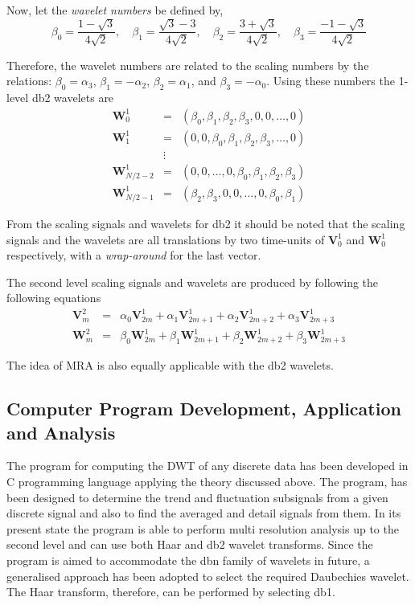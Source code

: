 \documentclass[a4paper,11pt]{article}
\begin{document}
Now, let the \emph{wavelet numbers} be defined by,
\begin{equation}
\beta_{0}=\frac{1-\sqrt{3}}{4\sqrt{2}}, \quad \beta_{1}=\frac{\sqrt{3}-3}{4\sqrt{2}}, \quad \beta_{2}=\frac{3+\sqrt{3}}{4\sqrt{2}}, \quad \beta_{3}=\frac{-1-\sqrt{3}}{4\sqrt{2}}
\end{equation}

Therefore, the wavelet numbers are related to the scaling numbers by the relations: $\beta_{0}=\alpha_{3}$, $\beta_{1}=-\alpha_{2}$, $\beta_{2}=\alpha_{1}$, and $\beta_{3}=-\alpha_{0}$. Using these numbers the 1-level db2 wavelets are
\begin{eqnarray}
\mathbf{W}_{0}^{1} & = & ( \beta_{0},\beta_{1},\beta_{2},\beta_{3},0,0,\ldots,0 ) \nonumber \\
\mathbf{W}_{1}^{1} & = & ( 0,0,\beta_{0},\beta_{1},\beta_{2},\beta_{3},\ldots,0 ) \nonumber \\
	 & \vdots & 	\nonumber \\
\mathbf{W}_{N/2-2}^{1} & = & ( 0,0,\ldots,0,\beta_{0},\beta_{1},\beta_{2},\beta_{3} ) \nonumber \\ 
\mathbf{W}_{N/2-1}^{1} & = & ( \beta_{2},\beta_{3},0,0,\ldots,0,\beta_{0},\beta_{1} )  
\end{eqnarray}

From the scaling signals and wavelets for db2 it should be noted that the scaling signals and the wavelets are all translations by two time-units of $\mathbf{V}_{0}^{1}$ and $\mathbf{W}_{0}^{1}$ respectively, with a \emph{wrap-around} for the last vector.

The second level scaling signals and wavelets are produced by following the following equations
\begin{eqnarray}
\mathbf{V}_{m}^{2} & = & \alpha_{0}\mathbf{V}_{2m}^{1}+\alpha_{1}\mathbf{V}_{2m+1}^{1}+\alpha_{2}\mathbf{V}_{2m+2}^{1}+\alpha_{3}\mathbf{V}_{2m+3}^{1} \\
\mathbf{W}_{m}^{2} & = & \beta_{0}\mathbf{W}_{2m}^{1}+\beta_{1}\mathbf{W}_{2m+1}^{1}+\beta_{2}\mathbf{W}_{2m+2}^{1}+\beta_{3}\mathbf{W}_{2m+3}^{1} 
\end{eqnarray}

The idea of MRA is also equally applicable with the db2 wavelets. \cite{walker}

\subsection{Computer Program Development, Application and Analysis}
The program for computing the DWT of any discrete data has been developed in C programming language applying the theory discussed above. The program, has been designed to determine the trend and fluctuation subsignals from a given discrete signal and also to find the averaged and detail signals from them. In its present state the program is able to perform multi resolution analysis up to the second level and can use both Haar and db2 wavelet transforms. Since the program is aimed to accommodate the dbn family of wavelets in future, a generalised approach has been adopted to select the required Daubechies wavelet. The Haar transform, therefore, can be performed by selecting db1.
\end{document}
